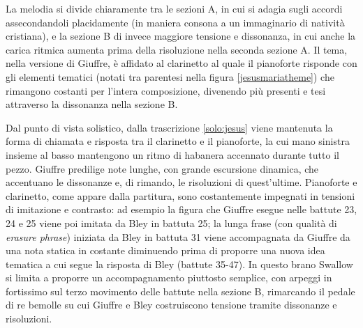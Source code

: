 La melodia si divide chiaramente tra le sezioni A, in cui si adagia sugli accordi assecondandoli placidamente (in maniera consona a un immaginario di natività cristiana), e la sezione B di invece maggiore tensione e dissonanza, in cui anche la carica ritmica aumenta prima della risoluzione nella seconda sezione A. Il tema, nella versione di Giuffre, è affidato al clarinetto al quale il pianoforte risponde con gli elementi tematici (notati tra parentesi nella figura \ref{jesusmariatheme}) che rimangono costanti per l'intera composizione, divenendo più presenti e tesi attraverso la dissonanza nella sezione B.\par
Dal punto di vista solistico, dalla trascrizione \ref{solo:jesus} viene mantenuta la forma di chiamata e risposta tra il clarinetto e il pianoforte, la cui mano sinistra insieme al basso mantengono un ritmo di habanera accennato durante tutto il pezzo. Giuffre predilige note lunghe, con grande escursione dinamica, che accentuano le dissonanze e, di rimando, le risoluzioni di quest'ultime. Pianoforte e clarinetto, come appare dalla partitura, sono costantemente impegnati in tensioni di imitazione e contrasto: ad esempio la figura che Giuffre esegue nelle battute 23, 24 e 25 viene poi imitata da Bley in battuta 25; la lunga frase (con qualità di \textit{erasure phrase}) iniziata da Bley in battuta 31 viene accompagnata da Giuffre da una nota statica in costante diminuendo prima di proporre una nuova idea tematica a cui segue la risposta di Bley (battute 35-47). In questo brano Swallow si limita a proporre un accompagnamento piuttosto semplice, con arpeggi in fortissimo sul terzo movimento delle battute nella sezione B, rimarcando il pedale di re bemolle su cui Giuffre e Bley costruiscono tensione tramite dissonanze e risoluzioni.

